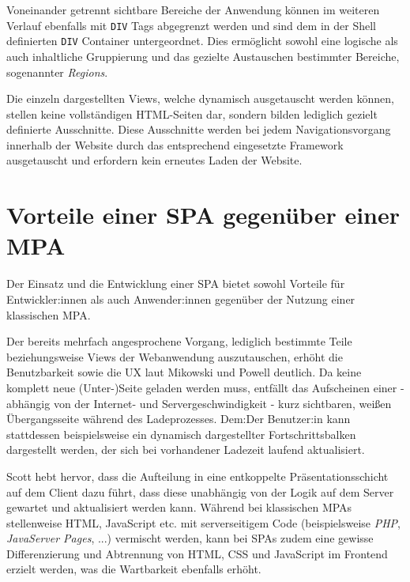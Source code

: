 \documentclass[a4paper,12pt,twoside]{scrreprt}
\begin{document}
Voneinander getrennt sichtbare Bereiche der Anwendung können im weiteren Verlauf ebenfalls mit \texttt{DIV} Tags abgegrenzt werden und sind dem in der Shell definierten \texttt{DIV} Container untergeordnet. Dies ermöglicht sowohl eine logische als auch inhaltliche Gruppierung und das gezielte Austauschen bestimmter Bereiche, sogenannter \textit{Regions}. \parencite[][Seite 9]{scott_spa_2015}

\medskip

Die einzeln dargestellten Views, welche dynamisch ausgetauscht werden können, stellen keine vollständigen HTML-Seiten dar, sondern bilden lediglich gezielt definierte Ausschnitte. Diese Ausschnitte werden bei jedem Navigationsvorgang innerhalb der Website durch das entsprechend eingesetzte Framework ausgetauscht und erfordern kein erneutes Laden der Website. \parencite[][Seite 10f.]{scott_spa_2015}

\section{Vorteile einer \acs{SPA} gegenüber einer \acs{MPA}}
\label{sec:vorteile-spa-mpa}
Der Einsatz und die Entwicklung einer \ac{SPA} bietet sowohl Vorteile für Entwickler:innen als auch Anwender:innen gegenüber der Nutzung einer klassischen \ac{MPA}.

Der bereits mehrfach angesprochene Vorgang, lediglich bestimmte Teile beziehungsweise Views der Webanwendung auszutauschen, erhöht die Benutzbarkeit sowie die \ac{UX} laut Mikowski und Powell deutlich. Da keine komplett neue (Unter-)Seite geladen werden muss, entfällt das Aufscheinen einer - abhängig von der Internet- und Servergeschwindigkeit - kurz sichtbaren, weißen Übergangsseite während des Ladeprozesses. Dem:Der Benutzer:in kann stattdessen beispielsweise ein dynamisch dargestellter Fortschrittsbalken dargestellt werden, der sich bei vorhandener Ladezeit laufend aktualisiert. \parencite[][Seite 20]{mikowski_single_2013}

Scott hebt hervor, dass die Aufteilung in eine entkoppelte Präsentationsschicht auf dem Client dazu führt, dass diese unabhängig von der Logik auf dem Server gewartet und aktualisiert werden kann. Während bei klassischen \acsp{MPA} stellenweise HTML, JavaScript etc. mit serverseitigem Code (beispielsweise \textit{PHP}, \textit{JavaServer Pages}, ...) vermischt werden, kann bei \acsp{SPA} zudem eine gewisse Differenzierung und Abtrennung von HTML, \ac{CSS} und JavaScript im Frontend erzielt werden, was die Wartbarkeit ebenfalls erhöht. \parencite[][Seite 13]{scott_spa_2015}
\end{document}
